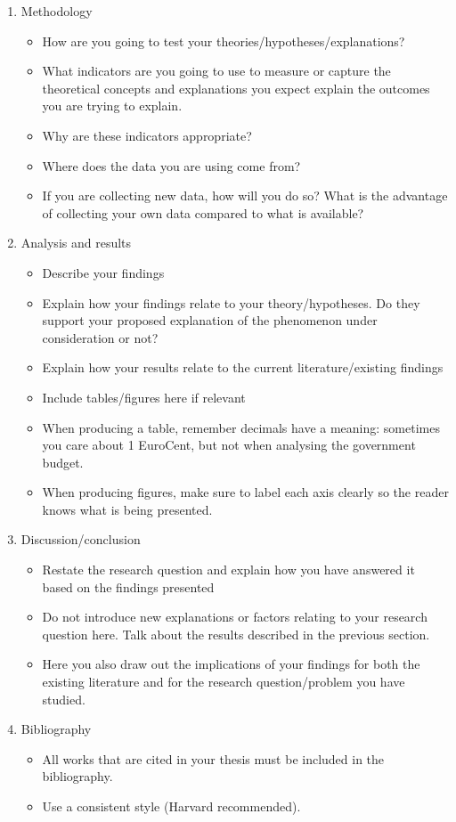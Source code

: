 \documentclass[a4paper,12pt]{article}
\begin{document}
\begin{enumerate}
	\item Methodology
	\begin{itemize}
		\item How are you going to test your theories/hypotheses/explanations?
		\item What indicators are you going to use to measure or capture the theoretical concepts and explanations you expect explain the outcomes you are trying to explain. 
		\item Why are these indicators appropriate?
		\item Where does the data you are using come from?
		\item If you are collecting new data, how will you do so? What is the advantage of collecting your own data compared to what is available?
	\end{itemize}

	\item Analysis and results
	\begin{itemize}
		\item Describe your findings
		\item Explain how your findings relate to your theory/hypotheses. Do they support your proposed explanation of the phenomenon under consideration or not?
		\item Explain how your results relate to the current literature/existing findings
		\item Include tables/figures here if relevant
		\item When producing a table, remember decimals have a meaning: sometimes you care about 1 EuroCent, but not when analysing the government budget.
		\item When producing figures, make sure to label each axis clearly so the reader knows what is being presented.
	\end{itemize}

	\item Discussion/conclusion
	\begin{itemize}
		\item Restate the research question and explain how you have answered it based on the findings presented
		\item Do not introduce new explanations or factors relating to your research question here. Talk about the results described in the previous section.
		\item Here you also draw out the implications of your findings for both the existing literature and for the research question/problem you have studied.
	\end{itemize}

	\item Bibliography
	\begin{itemize}
		\item All works that are cited in your thesis must be included in the bibliography.
		\item Use a consistent style (Harvard recommended).
	\end{itemize}
\end{enumerate}
\end{document}
